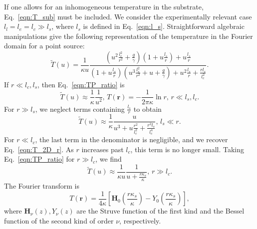 \documentclass[aps, prb, reprint, superscriptaddress]{revtex4-2}
\renewcommand{\vec}{\mathbf}
\begin{document}
If one allows for an inhomogeneous temperature in the substrate, Eq.~\eqref{eqn:T_sub} must be included.
We consider the experimentally relevant case $l_l = l_e = l_c\gg l_s$, where $l_s$ is defined in Eq.~\eqref{eqn:l_s}.
Straightforward algebraic manipulations give the following representation of the temperature in the Fourier domain for a point source:
\begin{equation}
	\tilde{T}(u) = \frac{1}{\kappa u}\frac{\left(u^2\frac{l_c^2}{r^2} + \frac{g}{\gamma}\right)\left(1 + u\frac{l_s}{r}\right) + u\frac{l_s}{r}}{\left(1 + u\frac{l_s}{r}\right)\left(u^3\frac{l_s^2}{r^2} + u + \frac{g}{\gamma}\right)+u^2\frac{l_s}{r} + \frac{r l_s}{l_c^2}}. 
	\label{eqn:TP_ratio}
\end{equation}
If $r\ll l_c, l_s$, then Eq.~\eqref{eqn:TP_ratio} is 
\begin{equation}
	\tilde{T}(u) \approx \frac{1}{\kappa}\frac{1}{u^2}, \, T(\vec{r}) = -\frac{1}{2\pi\kappa}\ln r, \, r\ll l_s, l_c. 
	\label{eqn:Tcase1}
\end{equation}
For $r\gg l_s$, we neglect terms containing $\frac{l_s}{r}$ to obtain 
\begin{equation}
	\tilde{T}(u) \approx \frac{1}{\kappa}\frac{u}{u^3 + u\frac{r^2}{l_c^2} + \frac{r^3 l_s}{l_c^4}}, \, l_s\ll r. 
	\label{eqn:Tcase2}
\end{equation}
For $r\ll l_c$, the last term in the denominator is negligible, and we recover Eq.~\eqref{eqn:T_2D_r}. 
As $r$ increases past $l_c$, this term is no longer small.
Taking Eq.~\eqref{eqn:TP_ratio} for $r\gg l_c$, we find 
\begin{equation}
	\tilde{T}(u) \approx \frac{1}{\kappa u}\frac{1}{u + \frac{r \kappa_s}{\kappa}}, \, r\gg l_c. 
\end{equation}
The Fourier transform is 
\begin{equation}
	T(\vec{r}) = \frac{1}{4\kappa}\left[\mathbf{H}_0\left( \frac{r \kappa_s}{\kappa}\right) - Y_0\left(\frac{r \kappa_s}{\kappa}\right)\right], 
\end{equation}
where $\mathbf{H}_\nu(z), Y_\nu(z)$ are the Struve function of the first kind and the Bessel function of the second kind of order $\nu$, respectively. 
\end{document}
